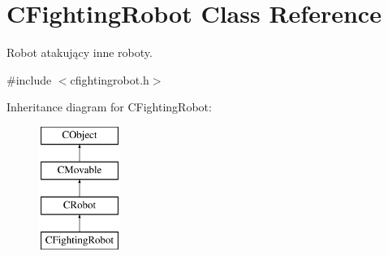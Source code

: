 \hypertarget{class_c_fighting_robot}{}\section{C\+Fighting\+Robot Class Reference}
\label{class_c_fighting_robot}


Robot atakujący inne roboty.  




{\ttfamily \#include $<$cfightingrobot.\+h$>$}

Inheritance diagram for C\+Fighting\+Robot\+:\begin{figure}[H]
\begin{center}
\leavevmode
\includegraphics[height=4.000000cm]{class_c_fighting_robot}
\end{center}
\end{figure}
